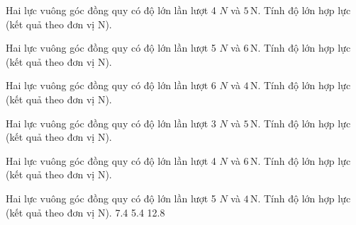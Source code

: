 \begin{bt}
Hai lực vuông góc đồng quy có độ lớn lần lượt 4 $N$ và $5\,\text{N}$. Tính độ lớn hợp lực (kết quả theo đơn vị N).
\end{bt}

\begin{bt}
Hai lực vuông góc đồng quy có độ lớn lần lượt 5 $N$ và $6\,\text{N}$. Tính độ lớn hợp lực (kết quả theo đơn vị N).
\end{bt}

\begin{bt}
Hai lực vuông góc đồng quy có độ lớn lần lượt 6 $N$ và $4\,\text{N}$. Tính độ lớn hợp lực (kết quả theo đơn vị N).
\end{bt}

\begin{bt}
Hai lực vuông góc đồng quy có độ lớn lần lượt 3 $N$ và $5\,\text{N}$. Tính độ lớn hợp lực (kết quả theo đơn vị N).
\end{bt}

\begin{bt}
Hai lực vuông góc đồng quy có độ lớn lần lượt 4 $N$ và $6\,\text{N}$. Tính độ lớn hợp lực (kết quả theo đơn vị N).
\end{bt}

\begin{ex}
Hai lực vuông góc đồng quy có độ lớn lần lượt 5 $N$ và $4\,\text{N}$. Tính độ lớn hợp lực (kết quả theo đơn vị N).
\choice
{}
{7.4}
{5.4}
{12.8}
\end{ex}

